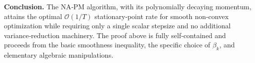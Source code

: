 \documentclass{article}
\begin{document}
\bigskip
\noindent\textbf{Conclusion.}  The NA‑PM algorithm, with its polynomially decaying momentum, attains the optimal $\mathcal O(1/T)$ stationary‑point rate for smooth non‑convex optimization while requiring only a single scalar stepsize and no additional variance‑reduction machinery.  The proof above is fully self‑contained and proceeds from the basic smoothness inequality, the specific choice of $\beta_k$, and elementary algebraic manipulations.
\end{document}
